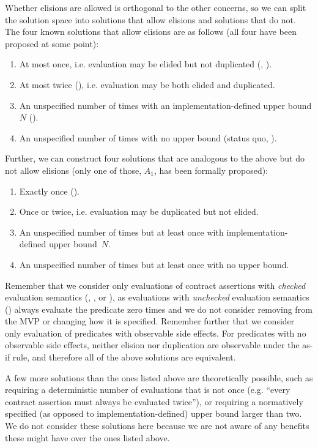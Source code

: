 Whether elisions are allowed is orthogonal to the other concerns, so we can split the solution space into solutions that allow elisions and solutions that do not. The four known solutions that allow elisions are as follows (all four have been proposed at some point):

\renewcommand{\theenumi}{$\Alph{enumi}_0$} \begin{enumerate}
\item At most once, i.e. evaluation may be elided but not duplicated (\cite{P1670R0}, \cite{D3197R0}).
\item At most twice (\cite{P2521R5}), i.e. evaluation may be both elided and duplicated.
\item An unspecified number of times with an implementation-defined upper bound $N$ (\cite{P3119R0}).
\item An unspecified number of times with no upper bound (status quo, \cite{P2900R6}).
\end{enumerate}
Further, we can construct four solutions that are analogous to the above but do not allow elisions (only one of those, $A_1$, has been formally proposed):
\renewcommand{\theenumi}{$\Alph{enumi}_1$} \begin{enumerate}
\item Exactly once (\cite{P2756R0}).
\item Once or twice, i.e. evaluation may be duplicated but not elided.
\item An unspecified number of times but at least once with implementation-defined upper \mbox{bound $N$}.
\item An unspecified number of times but at least once with no upper bound.
\end{enumerate}

 Remember that we consider only evaluations of contract assertions with \emph{checked} evaluation semantics (, , or ), as evaluations with \emph{unchecked} evaluation semantics () always evaluate the predicate zero times and we do not consider removing  from the MVP or changing how it is specified. Remember further that we consider only evaluation of predicates with observable side effects. For predicates with no observable side effects, neither elision nor duplication are observable under the as-if rule, and therefore all of the above solutions are equivalent. 

A few more solutions than the ones listed above are theoretically possible, such as requiring a deterministic number of evaluations that is not once (e.g. ``every contract assertion must always be evaluated twice''), or requiring a normatively specified (as opposed to implementation-defined) upper bound larger than two. We do not consider these solutions here because we are not aware of any benefits these might have over the ones listed above. 

